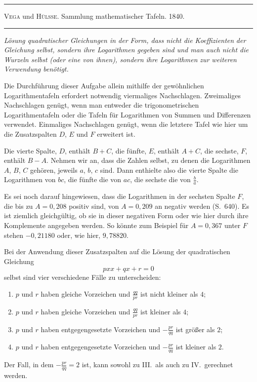 \par{}\begin{center}\rule{0.7\linewidth}{0.4pt}\par \textsc{Vega} und \textsc{Hülsse.} Sammlung mathematischer Tafeln. 1840.\par\rule{0.7\linewidth}{0.4pt}\end{center}

\noindent\textit{Lösung quadratischer Gleichungen in der Form, dass nicht die Koeffizienten}
\textit{der Gleichung selbst, sondern ihre Logarithmen gegeben sind und man auch}
\textit{nicht die Wurzeln selbst (oder eine von ihnen), sondern ihre Logarithmen}
\textit{zur weiteren Verwendung benötigt.}

Die Durchführung dieser Aufgabe allein mithilfe der gewöhnlichen Logarithmentafeln erfordert notwendig viermaliges Nachschlagen. Zweimaliges Nachschlagen genügt, wenn man entweder die trigonometrischen Logarithmentafeln oder die Tafeln für Logarithmen von Summen und  Differenzen verwendet. Einmaliges Nachschlagen genügt, wenn die letztere Tafel wie hier um die Zusatzspalten $D$, $E$ und $F$ erweitert ist.

Die vierte Spalte, $D$, enthält $B+C$, die fünfte, $E$, enthält $A+C$,
die sechste, $F$, enthält $B-A$. Nehmen wir an, dass die Zahlen selbst, zu denen die Logarithmen $A$, $B$, $C$ gehören, jeweils $a$, $b$, $c$ sind. Dann enthielte also die vierte Spalte die Logarithmen von $bc$, die fünfte die von $ac$, die
sechste die von $\frac{b}{a}$.

Es sei noch darauf hingewiesen, dass die Logarithmen in der sechsten Spalte $F$, die bis zu $A=0{,}208$ positiv sind, von $A=0{,}209$
an negativ werden (S.\ 640). Es ist ziemlich gleichgültig, ob sie in dieser negativen Form oder wie hier durch ihre Komplemente angegeben werden. So könnte zum Beispiel für $A=0{,}367$ unter $F$ stehen $-0{,}21180$ oder, wie hier, $9{,}78820$.

Bei der Anwendung dieser Zusatzspalten auf die Lösung der quadratischen Gleichung
\[
pxx+qx+r=0
\]
selbst sind vier verschiedene Fälle zu unterscheiden:
\begin{enumerate}
\item[I.] $p$ und $r$ haben gleiche Vorzeichen und $\frac{qq}{pr}$ ist nicht kleiner als $4$;
\item[II.] $p$ und $r$ haben gleiche Vorzeichen und $\frac{qq}{pr}$ ist kleiner als $4$;
\item[III.] $p$ und $r$ haben entgegengesetzte Vorzeichen und $-\frac{pr}{qq}$ ist größer als $2$;
\item[IV.] $p$ und $r$ haben entgegengesetzte Vorzeichen und $-\frac{pr}{qq}$ ist kleiner als $2$.
\end{enumerate}
Der Fall, in dem $-\frac{pr}{qq}=2$ ist, kann sowohl zu III.\ als auch zu IV.\ gerechnet werden.

